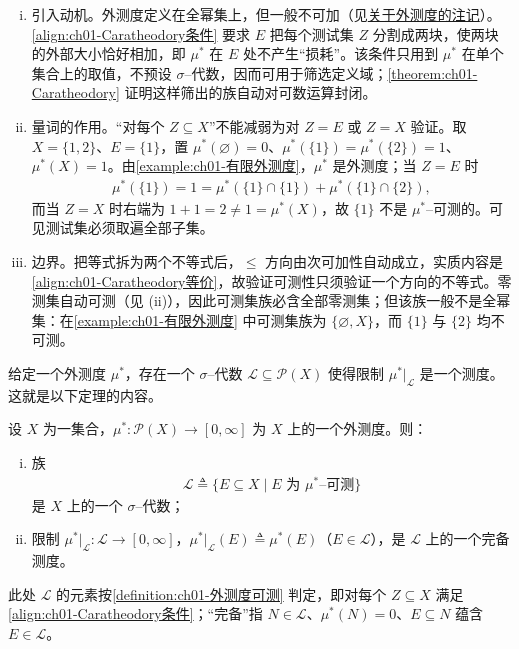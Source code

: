 \documentclass[../../main.tex]{subfiles}%
\begin{document}
\begin{remark}\label{remark:ch01-可测性条件}
\begin{enumerate}[(i)]
\item 引入动机。外测度定义在全幂集上，但一般不可加（见\hyperref[remark:ch01-外测度]{关于外测度的注记}）。\eqref{align:ch01-Caratheodory条件} 要求 $E$ 把每个测试集 $Z$ 分割成两块，使两块的外部大小恰好相加，即 $\mu^*$ 在 $E$ 处不产生“损耗”。该条件只用到 $\mu^*$ 在单个集合上的取值，不预设 $\sigma$--代数，因而可用于筛选定义域；\cref{theorem:ch01-Caratheodory} 证明这样筛出的族自动对可数运算封闭。
\item 量词的作用。“对每个 $Z\subseteq X$”不能减弱为对 $Z=E$ 或 $Z=X$ 验证。取 $X=\{1,2\}$、$E=\{1\}$，置 $\mu^*(\varnothing )=0$、$\mu^*(\{1\})=\mu^*(\{2\})=1$、$\mu^*(X)=1$。由\cref{example:ch01-有限外测度}，$\mu^*$ 是外测度；当 $Z=E$ 时
\begin{align*}
\mu^*(\{1\})=1=\mu^*(\{1\}\cap\{1\})+\mu^*(\{1\}\cap\{2\}),
\end{align*}
而当 $Z=X$ 时右端为 $1+1=2\neq 1=\mu^*(X)$，故 $\{1\}$ 不是 $\mu^*$--可测的。可见测试集必须取遍全部子集。
\item 边界。把等式拆为两个不等式后，$\leqslant$ 方向由次可加性自动成立，实质内容是\eqref{align:ch01-Caratheodory等价}，故验证可测性只须验证一个方向的不等式。零测集自动可测（见 (ii)），因此可测集族必含全部零测集；但该族一般不是全幂集：在\cref{example:ch01-有限外测度} 中可测集族为 $\{\varnothing ,X\}$，而 $\{1\}$ 与 $\{2\}$ 均不可测。
\end{enumerate}
\end{remark}

给定一个外测度 $\mu^*$，存在一个 $\sigma$--代数 $\mathcal{L}\subseteq\mathcal{P}(X)$ 使得限制 $\mu^*|_{\mathcal{L}}$ 是一个测度。这就是以下定理的内容。

\begin{theorem}[Carathéodory]\label{theorem:ch01-Caratheodory}
设 $X$ 为一集合，$\mu^*:\mathcal{P}(X)\to[0,\infty]$ 为 $X$ 上的一个外测度。则：
\begin{enumerate}[(i)]
\item 族
\begin{align}
\mathcal{L}\triangleq \{E\subseteq X\mid E\text{ 为 }\mu^*\text{--可测}\}\label{align:ch01-L族}
\end{align}
是 $X$ 上的一个 $\sigma$--代数；
\item 限制 $\mu^*|_{\mathcal{L}}:\mathcal{L}\to[0,\infty]$，$\mu^*|_{\mathcal{L}}(E)\triangleq\mu^*(E)$（$E\in\mathcal{L}$），是 $\mathcal{L}$ 上的一个完备测度。
\end{enumerate}
此处 $\mathcal{L}$ 的元素按\cref{definition:ch01-外测度可测} 判定，即对每个 $Z\subseteq X$ 满足\eqref{align:ch01-Caratheodory条件}；“完备”指 $N\in\mathcal{L}$、$\mu^*(N)=0$、$E\subseteq N$ 蕴含 $E\in\mathcal{L}$。
\end{theorem}
\end{document}
